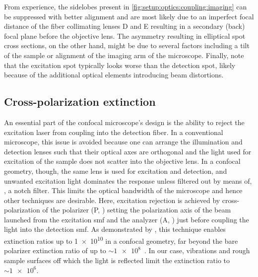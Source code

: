 From experience, the sidelobes present in \cref{fig:setup:optics:coupling:imaging} can be suppressed with better alignment and are most likely due to an imperfect focal distance of the fiber collimating lenses D and E resulting in a secondary (back) focal plane before the objective lens.
The asymmetry resulting in elliptical spot cross sections, on the other hand, might be due to several factors including a tilt of the sample or alignment of the imaging arm of the microscope.
Finally, note that the excitation spot typically looks worse than the detection spot, likely because of the additional optical elements introducing beam distortions.

\subsection{Cross-polarization extinction}\label{subsec:setup:optics:coupling:rejection}
An essential part of the confocal microscope's design is the ability to reject the excitation laser from coupling into the detection fiber.
In a conventional microscope, this issue is avoided because one can arrange the illumination and detection lenses such that their optical axes are orthogonal and the light used for excitation of the sample does not scatter into the objective lens.
In a confocal geometry, though, the same lens is used for excitation and detection, and unwanted excitation light dominates the response unless filtered out by means of, \eg, a notch filter.
This limits the optical bandwidth of the microscope and hence other techniques are desirable.
Here, excitation rejection is achieved by cross-polarization of the polarizer (P, \polarizer) setting the polarization axis of the beam launched from the excitation \gls{smf} and the analyzer (A, \polarizer) just before coupling the light into the detection \gls{smf}.
As demonstrated by \citet{Benelajla2021}, this technique enables extinction ratios
up to \num[print-unity-mantissa=false]{1e10} in a confocal geometry, far beyond the bare polarizer extinction ratio of up to $\sim\num[print-unity-mantissa=false]{1e8}$~\cite{ThorlabsLPVIS050-MP2}.
In our case, vibrations and rough sample surfaces off which the light is reflected limit the extinction ratio to $\sim\num[print-unity-mantissa=false]{1e6}$.

